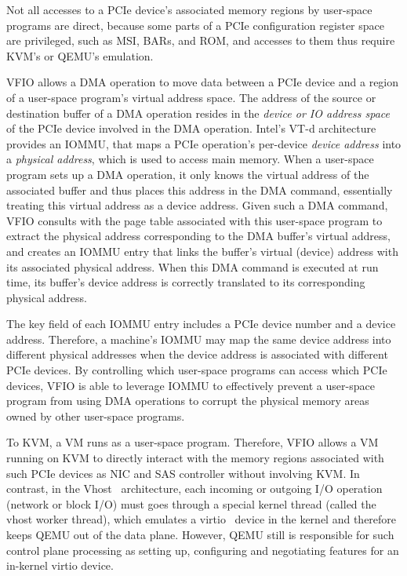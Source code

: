 Not all accesses to a PCIe device's associated memory regions by user-space programs are direct, 
because some parts of a PCIe configuration register space are privileged, such as MSI, BARs, and ROM,  and accesses to them 
thus require KVM's or QEMU's emulation. 

VFIO allows a DMA operation to move data between a PCIe device and 
a region of a user-space program's virtual address space.
The address of the source or destination buffer of a DMA operation resides in the {\em device or IO address space} of the PCIe device involved in the DMA operation.
Intel's VT-d architecture provides an IOMMU, that maps a PCIe operation's per-device {\em device address} into a {\em physical address}, which is used to access main memory.
When a user-space program sets up a DMA operation, it only knows the virtual address of the associated buffer and thus places
this address in the DMA command, essentially treating this virtual address as a device address. 
Given such a DMA command, VFIO consults with the page table associated with this user-space program to extract the physical address corresponding
to the DMA buffer's virtual address, and creates an IOMMU entry that links the buffer's virtual (device) address with its associated physical address. 
When this DMA command is executed at run time, its buffer's device address is correctly translated to its corresponding physical address.
   
The key field of each IOMMU entry includes a PCIe device number and a device address.
Therefore, a machine's IOMMU may map the same device address into different physical addresses when the device address is associated with different PCIe devices.
By controlling which user-space programs can access which PCIe devices, VFIO is able to leverage IOMMU to effectively prevent a user-space program 
from using DMA operations to corrupt the physical memory areas owned by other user-space programs.

To KVM, a VM runs as a user-space program.
Therefore, VFIO allows a VM running on KVM to directly interact with the memory regions associated with 
such PCIe devices as NIC and SAS controller without involving KVM.
In contrast, in the Vhost~\cite{vhost} architecture, each incoming or outgoing I/O operation (network or block I/O) must goes through 
a special kernel thread (called the vhost worker thread), which emulates a virtio~\cite{virtio} device in the kernel and therefore keeps QEMU out of the data plane.
However, QEMU still is responsible for such control plane processing as setting up, configuring and negotiating features for an in-kernel virtio device.  



